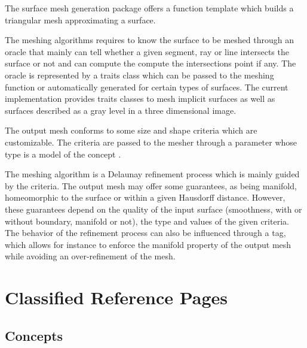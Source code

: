 

The surface mesh generation package offers a function template
which builds a triangular mesh approximating a surface.

The meshing algorithms requires to know the surface to be meshed
through an oracle that mainly can tell whether a
given segment, ray or line  intersects the surface or not
and can compute the compute the
intersections point if any. The oracle is represented by a traits class
which can be passed to the meshing function
or automatically generated for certain types of surfaces.
The current implementation provides 
traits classes 
to mesh implicit surfaces as well as  surfaces described 
as a gray level in a three
dimensional image.
 
The output mesh conforms to some size and shape criteria 
which are customizable. The criteria are passed to the mesher
through a parameter 
whose type is a model of the
concept .

The meshing algorithm is a Delaunay refinement process
which is mainly guided by the criteria. 
The output mesh may offer some guarantees, as being manifold,
homeomorphic to the surface or within a given
Hausdorff distance.  However, these guarantees depend 
on the quality of the input surface (smoothness, with or without
boundary, manifold or  not),
the type and values of the given criteria. 
The behavior of the refinement process can also be influenced through
a tag, which allows for instance to enforce the manifold property
of  the output mesh  while avoiding an over-refinement of the mesh.



\section{Classified Reference Pages}

\subsection*{Concepts}

\\
 \\
 \\
 \\
 \\
 \\
 \\


